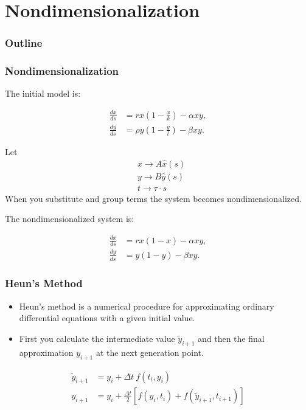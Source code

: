 
\section{Nondimensionalization}
\begin{frame}
  \frametitle{Outline}
  \tableofcontents[ currentsection ]
\end{frame}

\begin{frame}
\frametitle{Nondimensionalization}

The initial model is:

  \begin{align*}
    \frac{dx}{ds} & = rx \left(1-\frac{x}{k}\right) - \alpha xy, \\
    \frac{dy}{ds} & = \rho y \left(1-\frac{y}{l}\right) - \beta xy.
  \end{align*}
	
Let 
\begin{align*}
		& x \rightarrow A \hat{x} (s) \\
		& y \rightarrow B \hat{y} (s) \\
		& t \rightarrow \tau \cdot s
\end{align*}
When you substitute and group terms the system becomes nondimensionalized. 
\end{frame}

\begin{frame}
The nondimensionalized system is:

	\begin{align*}
		\frac{d{x}}{ds} &= rx(1-x) - \alpha xy, \\
		\frac{d{y}}{ds} &= y(1-y) - \beta xy.
	\end{align*}
\end{frame}


\begin{frame}
\frametitle{Heun's Method}
\begin{itemize}
\item Heun's method is a numerical procedure for approximating ordinary differential equations with a given initial value.
\item First you calculate the intermediate value $\tilde{y}_{i+1}$ and then the final approximation $y_{i+1}$ at the next generation point.
\end{itemize}

\begin{align*}
	\tilde{y}_{i+1} &= y_i + \Delta t \ f(t_i, y_i) \\
	y_{i+1} &= y_i + \frac{\Delta t}{2} \left[f(y_i,t_i) + f(\tilde{y}_{i+1}, t_{i+1})\right]
\end{align*}
\end{frame}